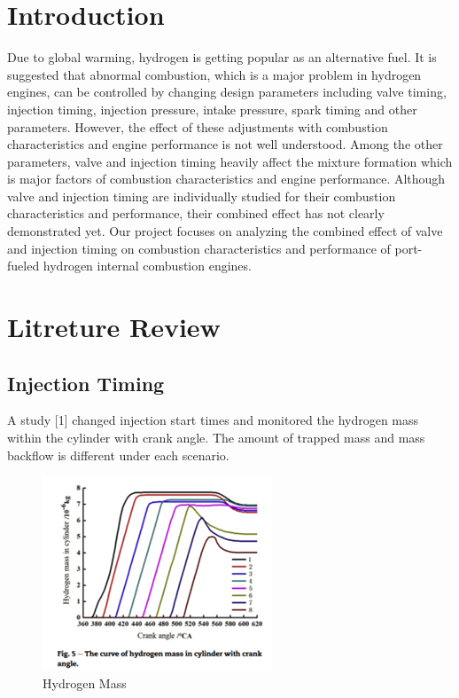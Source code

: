 \documentclass[conference]{IEEEtran}
\begin{document}
\section{Introduction}
Due to global warming, hydrogen is getting popular as an alternative fuel. It is suggested that abnormal combustion, which is a major problem in hydrogen engines, can be controlled by changing design parameters including valve timing, injection timing, injection pressure, intake pressure, spark timing and other parameters. However, the effect of these adjustments	with combustion characteristics and engine performance is not well understood. Among the other parameters, valve and injection timing heavily affect the mixture formation which is major factors of combustion characteristics and engine performance. Although valve and injection timing are individually studied for their combustion characteristics and performance, their combined effect has not clearly demonstrated  yet. Our project focuses on analyzing the combined effect of valve and injection timing on combustion characteristics and performance of port-fueled hydrogen internal combustion engines.

\section{Litreture Review}

\subsection{Injection Timing}


A study [1] changed injection start times and monitored the hydrogen mass within the cylinder with crank angle. The amount of trapped mass and mass backflow is different under each scenario. 

\begin{figure}[htbp]
\centerline{\includegraphics{figures/LR_IT_1.png}}
\caption{Hydrogen Mass}
\label{lr_it_1}
\end{figure}
\end{document}
